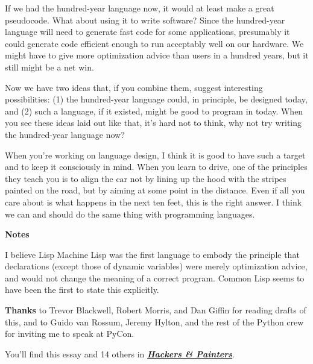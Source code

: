 If we had the hundred-year language now, it would at least make a
great pseudocode.  What about using it to write software?   
Since the hundred-year language
will need to generate fast code for some applications, presumably
it could generate code efficient enough to run acceptably well
on our hardware.  We might have to give more optimization advice
than users in a hundred years, but it still might be a net win.



Now we have two ideas that, if you combine them, suggest interesting
possibilities: (1) the hundred-year language could, in principle, be
designed today, and (2) such a language, if it existed, might be good to
program in today.  When you see these ideas laid out like that,
it's hard not to think, why not try writing the hundred-year language
now?

When you're working on language design, I think it is good to
have such a target and to keep it consciously in mind.  When you
learn to drive, one of the principles they teach you is to
align the car not by lining up the hood with the stripes painted
on the road, but by aiming at some point in the distance.  Even
if all you care about is what happens in the next ten feet, this
is the right answer.  I
think we can and should do the same thing with programming languages.




\textbf{Notes}

I believe Lisp Machine Lisp was the first language to embody
the principle that declarations (except those of dynamic variables)
were merely optimization advice,
and would not change the meaning of a correct program.  Common Lisp
seems to have been the first to state this explicitly.

\textbf{Thanks} to Trevor Blackwell, Robert Morris, and Dan Giffin for
reading drafts of this, and to Guido van Rossum, Jeremy Hylton, and the
rest of the Python crew for inviting me to speak at PyCon.







You'll find this essay and 14 others in
\href{http://www.paulgraham.com/hackpaint.html}{\textbf{\emph{Hackers \& Painters}}}.




